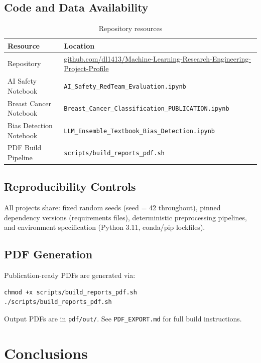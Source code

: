 \documentclass[11pt,a4paper]{article}
\begin{document}
\subsection{Code and Data Availability}

\begin{table}[H]
\centering
\caption{Repository resources}
\begin{tabular}{ll}
\toprule
\textbf{Resource} & \textbf{Location} \\
\midrule
Repository & \url{github.com/dl1413/Machine-Learning-Research-Engineering-Project-Profile} \\
AI Safety Notebook & \texttt{AI\_Safety\_RedTeam\_Evaluation.ipynb} \\
Breast Cancer Notebook & \texttt{Breast\_Cancer\_Classification\_PUBLICATION.ipynb} \\
Bias Detection Notebook & \texttt{LLM\_Ensemble\_Textbook\_Bias\_Detection.ipynb} \\
PDF Build Pipeline & \texttt{scripts/build\_reports\_pdf.sh} \\
\bottomrule
\end{tabular}
\label{tab:resources}
\end{table}

\subsection{Reproducibility Controls}

All projects share: fixed random seeds (seed = 42 throughout), pinned dependency versions (requirements files), deterministic preprocessing pipelines, and environment specification (Python 3.11, conda/pip lockfiles).

\subsection{PDF Generation}

Publication-ready PDFs are generated via:

\begin{verbatim}
chmod +x scripts/build_reports_pdf.sh
./scripts/build_reports_pdf.sh
\end{verbatim}

Output PDFs are in \texttt{pdf/out/}. See \texttt{PDF\_EXPORT.md} for full build instructions.

\section{Conclusions}
\end{document}
